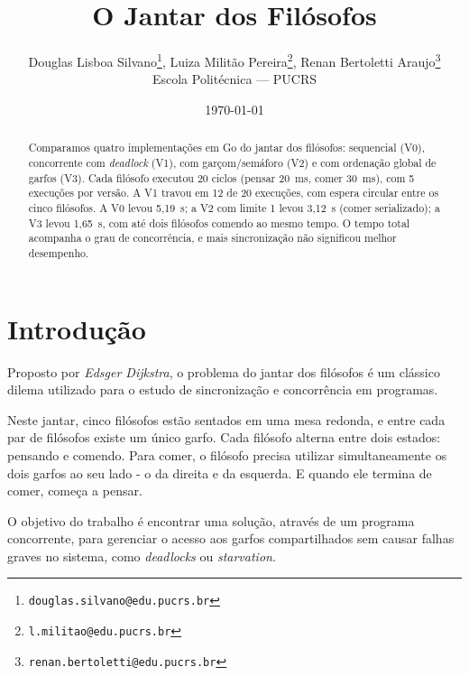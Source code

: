 \documentclass[12pt,brazil,a4paper]{article}
\begin{document}
\title{O Jantar dos Filósofos}

\author{Douglas Lisboa Silvano\thanks{\texttt{douglas.silvano@edu.pucrs.br}}, Luiza Militão Pereira\thanks{\texttt{l.militao@edu.pucrs.br}}, Renan Bertoletti Araujo\thanks{\texttt{renan.bertoletti@edu.pucrs.br}}\\
Escola Politécnica — PUCRS}

\date{\today}
\maketitle

\begin{abstract}
Comparamos quatro implementações em Go do jantar dos filósofos: sequencial (V0), concorrente com \textit{deadlock} (V1), com garçom/semáforo (V2) e com ordenação global de garfos (V3). Cada filósofo executou 20 ciclos (pensar 20~ms, comer 30~ms), com 5 execuções por versão. A V1 travou em 12 de 20 execuções, com espera circular entre os cinco filósofos. A V0 levou 5,19~s; a V2 com limite 1 levou 3,12~s (comer serializado); a V3 levou 1,65~s, com até dois filósofos comendo ao mesmo tempo. O tempo total acompanha o grau de concorrência, e mais sincronização não significou melhor desempenho.

\end{abstract}

\section{Introdução}
Proposto por \textit{{Edsger Dijkstra}}, o problema do jantar dos filósofos é um clássico dilema utilizado para o estudo de sincronização e concorrência em programas.

Neste jantar, cinco filósofos estão sentados em uma mesa redonda, e entre cada par de filósofos existe um único garfo. Cada filósofo alterna entre dois estados: pensando e comendo. Para comer, o filósofo precisa utilizar simultaneamente os dois garfos ao seu lado - o da direita e da esquerda. E quando ele termina de comer, começa a pensar.

O objetivo do trabalho é encontrar uma solução, através de um programa concorrente, para gerenciar o acesso aos garfos compartilhados sem causar falhas graves no sistema, como \textit{{deadlocks}} ou \textit{{starvation}}.
\end{document}
